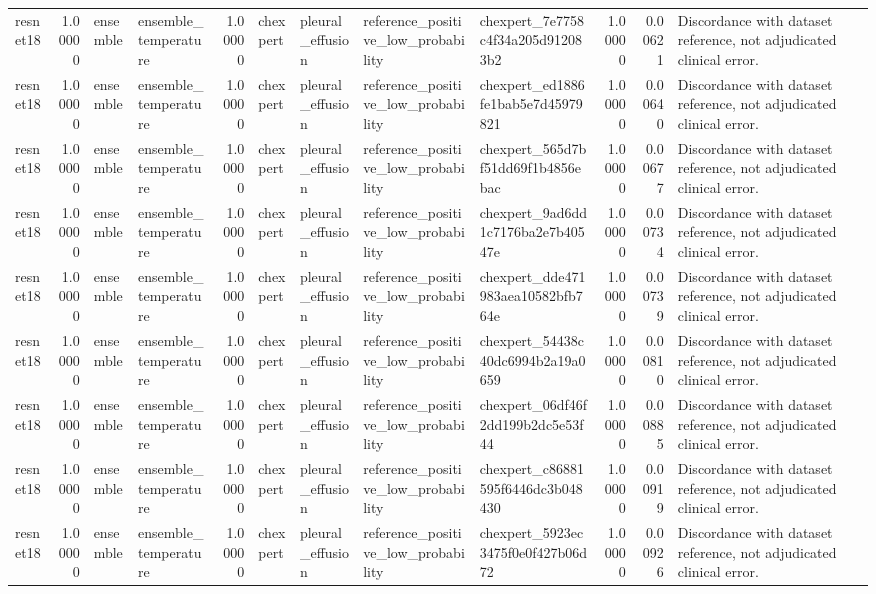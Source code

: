 \begin{tabular}{lrllrllllrrl}
resnet18 & 1.00000 & ensemble & ensemble\_temperature & 1.00000 & chexpert & pleural\_effusion & reference\_positive\_low\_probability & chexpert\_7e7758c4f34a205d912083b2 & 1.00000 & 0.00621 & Discordance with dataset reference, not adjudicated clinical error. \\
resnet18 & 1.00000 & ensemble & ensemble\_temperature & 1.00000 & chexpert & pleural\_effusion & reference\_positive\_low\_probability & chexpert\_ed1886fe1bab5e7d45979821 & 1.00000 & 0.00640 & Discordance with dataset reference, not adjudicated clinical error. \\
resnet18 & 1.00000 & ensemble & ensemble\_temperature & 1.00000 & chexpert & pleural\_effusion & reference\_positive\_low\_probability & chexpert\_565d7bf51dd69f1b4856ebac & 1.00000 & 0.00677 & Discordance with dataset reference, not adjudicated clinical error. \\
resnet18 & 1.00000 & ensemble & ensemble\_temperature & 1.00000 & chexpert & pleural\_effusion & reference\_positive\_low\_probability & chexpert\_9ad6dd1c7176ba2e7b40547e & 1.00000 & 0.00734 & Discordance with dataset reference, not adjudicated clinical error. \\
resnet18 & 1.00000 & ensemble & ensemble\_temperature & 1.00000 & chexpert & pleural\_effusion & reference\_positive\_low\_probability & chexpert\_dde471983aea10582bfb764e & 1.00000 & 0.00739 & Discordance with dataset reference, not adjudicated clinical error. \\
resnet18 & 1.00000 & ensemble & ensemble\_temperature & 1.00000 & chexpert & pleural\_effusion & reference\_positive\_low\_probability & chexpert\_54438c40dc6994b2a19a0659 & 1.00000 & 0.00810 & Discordance with dataset reference, not adjudicated clinical error. \\
resnet18 & 1.00000 & ensemble & ensemble\_temperature & 1.00000 & chexpert & pleural\_effusion & reference\_positive\_low\_probability & chexpert\_06df46f2dd199b2dc5e53f44 & 1.00000 & 0.00885 & Discordance with dataset reference, not adjudicated clinical error. \\
resnet18 & 1.00000 & ensemble & ensemble\_temperature & 1.00000 & chexpert & pleural\_effusion & reference\_positive\_low\_probability & chexpert\_c86881595f6446dc3b048430 & 1.00000 & 0.00919 & Discordance with dataset reference, not adjudicated clinical error. \\
resnet18 & 1.00000 & ensemble & ensemble\_temperature & 1.00000 & chexpert & pleural\_effusion & reference\_positive\_low\_probability & chexpert\_5923ec3475f0e0f427b06d72 & 1.00000 & 0.00926 & Discordance with dataset reference, not adjudicated clinical error. \\

\end{tabular}
